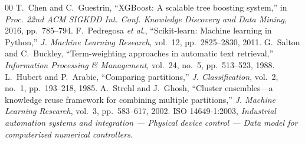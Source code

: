 \documentclass[conference]{IEEEtran}
\begin{document}
\begin{thebibliography}{00}
 T.~Chen and C.~Guestrin, ``XGBoost: A scalable tree boosting system,'' in \emph{Proc. 22nd ACM SIGKDD Int. Conf. Knowledge Discovery and Data Mining}, 2016, pp.~785--794.
 F.~Pedregosa \emph{et al.}, ``Scikit-learn: Machine learning in Python,'' \emph{J. Machine Learning Research}, vol.~12, pp.~2825--2830, 2011.
 G.~Salton and C.~Buckley, ``Term-weighting approaches in automatic text retrieval,'' \emph{Information Processing \& Management}, vol.~24, no.~5, pp.~513--523, 1988.
 L.~Hubert and P.~Arabie, ``Comparing partitions,'' \emph{J. Classification}, vol.~2, no.~1, pp.~193--218, 1985.
 A.~Strehl and J.~Ghosh, ``Cluster ensembles---a knowledge reuse framework for combining multiple partitions,'' \emph{J. Machine Learning Research}, vol.~3, pp.~583--617, 2002.
 ISO 14649-1:2003, \emph{Industrial automation systems and integration --- Physical device control --- Data model for computerized numerical controllers}.
\end{thebibliography}
\end{document}
